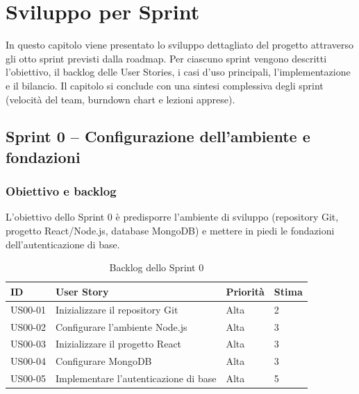 \chapter{Sviluppo per Sprint}
\label{chap:sviluppo-sprint}

In questo capitolo viene presentato lo sviluppo dettagliato del progetto attraverso gli otto sprint previsti dalla roadmap. Per ciascuno sprint vengono descritti l'obiettivo, il backlog delle User Stories, i casi d'uso principali, l'implementazione e il bilancio. Il capitolo si conclude con una sintesi complessiva degli sprint (velocità del team, burndown chart e lezioni apprese).

\section{Sprint 0 -- Configurazione dell'ambiente e fondazioni}
\label{sec:sprint0}

\subsection{Obiettivo e backlog}
\label{subsec:sprint0-obiettivo}

L'obiettivo dello Sprint 0 è predisporre l'ambiente di sviluppo (repository Git, progetto React/Node.js, database MongoDB) e mettere in piedi le fondazioni dell'autenticazione di base.

\begin{table}[H]
    \centering
    \caption{Backlog dello Sprint 0}
    \label{tab:sprint0-backlog}
    \renewcommand{\arraystretch}{1.3}
    \begin{tabular}{|p{1.8cm}|p{7cm}|p{2.5cm}|p{1.5cm}|}
        \hline
        \textbf{ID} & \textbf{User Story} & \textbf{Priorità} & \textbf{Stima} \\
        \hline
        US00-01 & Inizializzare il repository Git & Alta & 2 \\
        \hline
        US00-02 & Configurare l'ambiente Node.js & Alta & 3 \\
        \hline
        US00-03 & Inizializzare il progetto React & Alta & 3 \\
        \hline
        US00-04 & Configurare MongoDB & Alta & 3 \\
        \hline
        US00-05 & Implementare l'autenticazione di base & Alta & 5 \\
        \hline
    \end{tabular}
\end{table}


